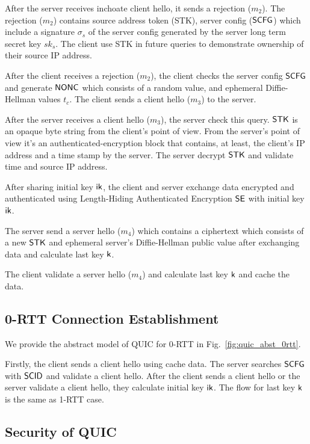 After the server receives inchoate client hello, it
sends a rejection ($m_2$). The rejection ($m_2$) contains
source address token (STK), server config ($\mathsf{SCFG}$) which
include a signature $\sigma_s$ of the server config generated
by the server long term secret key $sk_s$. The client use
STK in future queries to demonstrate ownership of their
source IP address.

After the client receives a rejection ($m_2$), the client
checks the server config $\mathsf{SCFG}$ and generate $\mathsf{NONC}$ which consists
of a random value, and ephemeral
Diffie-Hellman values $t_c$.
The client sends a client hello ($m_3$) to the server.

After the server receives a client hello ($m_3$), the
server check this query. $\mathsf{STK}$ is an opaque byte string
from the client's point of view. From the server's point
of view it's an authenticated-encryption block that
contains, at least, the client's IP address and a time
stamp by the server. The server decrypt $\mathsf{STK}$ and
validate time and source IP address.

After sharing initial key $\mathsf{ik}$, the client and server
exchange data encrypted and authenticated using Length-Hiding
Authenticated Encryption $\mathsf{SE}$ with initial key $\mathsf{ik}$.

The server send a server hello ($m_4$) which contains
a ciphertext which consists of a new $\mathsf{STK}$ and ephemeral server's
Diffie-Hellman public value after exchanging data and
calculate last key $\mathsf{k}$.

The client validate a server hello ($m_4$) and calculate
last key $\mathsf{k}$ and cache the data.

\subsection{0-RTT Connection Establishment} \label{sec:quic_0rtt}

We provide the abstract model of QUIC for 0-RTT in
Fig.~\ref{fig:quic_abst_0rtt}.
%

%
Firstly, the client sends a client hello using cache data.
The server searches $\mathsf{SCFG}$ with $\mathsf{SCID}$ and validate a
client hello.
After the client sends a client hello or the server validate
a client hello, they calculate initial key $\mathsf{ik}$.
The flow for last key $\mathsf{k}$ is the same as
1-RTT case.


\subsection{Security of QUIC} \label{sec:quic_detail}

